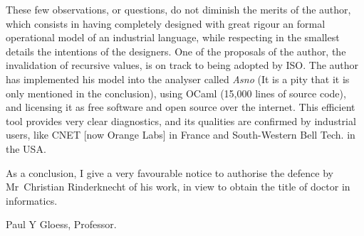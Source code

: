 \documentclass[a4paper,11pt,twoside]{article}
\begin{document}
These few observations, or questions, do not diminish the merits of
the author, which consists in having completely designed with great
rigour an formal operational model of an industrial language, while
respecting in the smallest details the intentions of the
designers. One of the proposals of the author, the invalidation of
recursive values, is on track to being adopted by ISO. The author has
implemented his model into the analyser called \emph{Asno} (It is a
pity that it is only mentioned in the conclusion), using OCaml (15,000
lines of source code), and licensing it as free software and open
source over the internet. This efficient tool provides very clear
diagnostics, and its qualities are confirmed by industrial users, like
CNET [now Orange Labs] in France and South\hyp{}Western Bell Tech. in
the USA.

As a conclusion, I give a very favourable notice to authorise the
defence by Mr~Christian Rinderknecht of his work, in view to obtain
the title of doctor in informatics.

\bigskip\bigskip

Paul Y Gloess, Professor.
\end{document}
